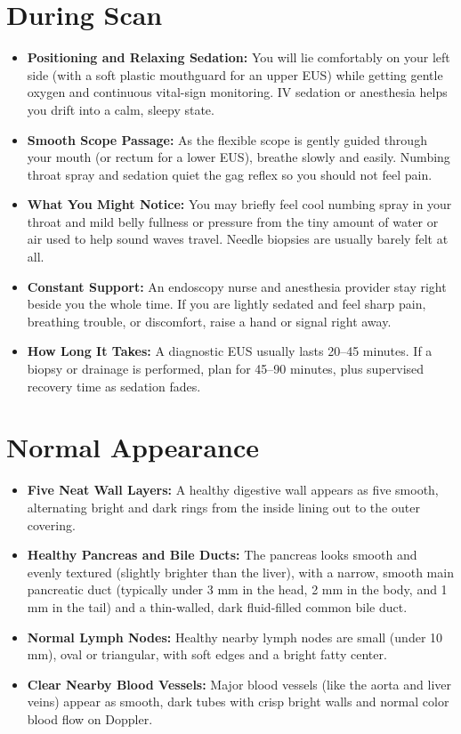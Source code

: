 \section{During Scan}

\begin{itemize}
    \item \textbf{Positioning and Relaxing Sedation:} You will lie comfortably on your left side (with a soft plastic mouthguard for an upper EUS) while getting gentle oxygen and continuous vital-sign monitoring. IV sedation or anesthesia helps you drift into a calm, sleepy state.
    \item \textbf{Smooth Scope Passage:} As the flexible scope is gently guided through your mouth (or rectum for a lower EUS), breathe slowly and easily. Numbing throat spray and sedation quiet the gag reflex so you should not feel pain.
    \item \textbf{What You Might Notice:} You may briefly feel cool numbing spray in your throat and mild belly fullness or pressure from the tiny amount of water or air used to help sound waves travel. Needle biopsies are usually barely felt at all.
    \item \textbf{Constant Support:} An endoscopy nurse and anesthesia provider stay right beside you the whole time. If you are lightly sedated and feel sharp pain, breathing trouble, or discomfort, raise a hand or signal right away.
    \item \textbf{How Long It Takes:} A diagnostic EUS usually lasts 20--45 minutes. If a biopsy or drainage is performed, plan for 45--90 minutes, plus supervised recovery time as sedation fades.
\end{itemize}

\section{Normal Appearance}

\begin{itemize}
    \item \textbf{Five Neat Wall Layers:} A healthy digestive wall appears as five smooth, alternating bright and dark rings from the inside lining out to the outer covering.
    \item \textbf{Healthy Pancreas and Bile Ducts:} The pancreas looks smooth and evenly textured (slightly brighter than the liver), with a narrow, smooth main pancreatic duct (typically under 3 mm in the head, 2 mm in the body, and 1 mm in the tail) and a thin-walled, dark fluid-filled common bile duct.
    \item \textbf{Normal Lymph Nodes:} Healthy nearby lymph nodes are small (under 10 mm), oval or triangular, with soft edges and a bright fatty center.
    \item \textbf{Clear Nearby Blood Vessels:} Major blood vessels (like the aorta and liver veins) appear as smooth, dark tubes with crisp bright walls and normal color blood flow on Doppler.
\end{itemize}

